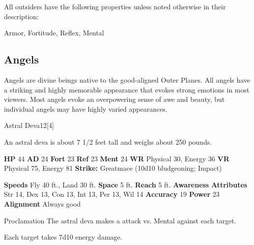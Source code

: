         All outsiders have the following properties unless noted otherwise in their description:
        
    
     Armor,
     Fortitude,
     Reflex,
     Mental
  
  
      
    \subsection{Angels}
      
      Angels are divine beings native to the good-aligned Outer Planes.
      All angels have a striking and highly memorable appearance that evokes strong emotions in most viewers.
      Most angels evoke an overpowering sense of awe and beauty, but individual angels may have highly varied appearances.
    

      

      
  \begin{monsubsection}{Astral Deva}{12}[4]
    \vspace{-1em}\vspace{-1em}
    \vspace{0em}

    
         An astral deva is about 7 1/2 feet tall and weighs about 250 pounds.
        
    

    \begin{spellcontent}
      \begin{spelltargetinginfo}
        \pari \textbf{HP} 44 \monsep
          \textbf{AD} 24 \monsep
          \textbf{Fort} 23 \monsep
          \textbf{Ref} 23 \monsep
          \textbf{Ment} 24
        \pari \textbf{WR} Physical 30, Energy 36 \monsep
        \textbf{VR} Physical 75, Energy 81
        \pari \textbf{Strike:}
            Greatmace  (10d10 bludgeoning; Impact)
      \end{spelltargetinginfo}
    \end{spellcontent}
    \begin{monsterfooter}
      \pari \textbf{Speeds} Fly 40 ft., Land 30 ft. \monsep
        \textbf{Space} 5 ft. \monsep
        \textbf{Reach} 5 ft.
      \pari \textbf{Awareness} 
      \pari \textbf{Attributes}
        Str 14, Dex 13,
        Con 13, Int 13,
        Per 13, Wil 14
      \pari \textbf{Accuracy} 19 \monsep
        \textbf{Power} 23
      \pari \textbf{Alignment} Always good
    \end{monsterfooter}
  \end{monsubsection}
  \begin{freeability}{Proclamation}
       The astral deva makes a  attack
        vs. Mental against each target.
    
    \hit Each target takes 7d10 energy damage.
    \end{freeability}
  

